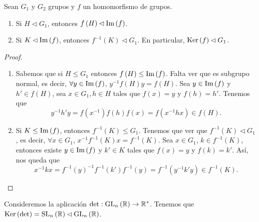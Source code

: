 \begin{prop}
Sean $\displaystyle G_{1} $ y $\displaystyle G_{2} $ grupos y $\displaystyle f $ un homomorfismo de grupos. 
\begin{enumerate}
\item Si $\displaystyle H \lhd G_{1} $, entonces $\displaystyle f\left(H\right) \lhd \operatorname{Im}\left(f\right) $.
\item Si $\displaystyle K \lhd \operatorname{Im}\left(f\right) $, entonces $\displaystyle f^{-1}\left(K\right)\lhd G_{1} $. En particular, $\displaystyle \operatorname{Ker}\left(f\right) \lhd G_{1} $.
\end{enumerate}
\end{prop}
\begin{proof}
\begin{enumerate}
\item Sabemos que si $\displaystyle H \leq G_{1} $ entonces $\displaystyle f\left(H\right) \leq \operatorname{Im}\left(f\right) $. Falta ver que es subgrupo normal, es decir, $\displaystyle \forall y \in \operatorname{Im}\left(f\right) $, $\displaystyle y^{-1}f\left(H\right)y = f\left(H\right) $. Sea $\displaystyle y \in \operatorname{Im}\left(f\right) $ y $\displaystyle h' \in f\left(H\right) $, sea $\displaystyle x \in G_{1}, h \in H $ tales que $\displaystyle f\left(x\right) = y $ y $\displaystyle f\left(h\right) = h' $. Tenemos que 
	\[y^{-1}h'y = f\left(x^{-1}\right)f\left(h\right)f\left(x\right) = f\left(x^{-1}hx\right) \in f\left(H\right) .\]
\item Si $\displaystyle K \leq \operatorname{Im}\left(f\right) $, entonces $\displaystyle f^{-1}\left(K\right) \leq G_{1} $. Tenemos que ver que $\displaystyle f^{-1}\left(K\right) \lhd G_{1} $, es decir, $\displaystyle \forall x \in G_{1} $, $\displaystyle x^{-1}f^{-1}\left(K\right)x = f^{-1}\left(K\right) $. Sea $\displaystyle x \in G_{1} $, $\displaystyle k \in f^{-1}\left(K\right) $, entonces existe $\displaystyle y \in \operatorname{Im}\left(f\right) $ y $\displaystyle k' \in K $ tales que $\displaystyle f\left(x\right) = y $ y $\displaystyle f\left(k\right) = k' $.
Así, nos queda que
\[x^{-1}kx = f^{-1}\left(y\right)^{-1}f^{-1}\left(k'\right)f^{-1}\left(y\right)  = f^{-1}\left(y^{-1}k'y\right) \in f^{-1}\left(K\right) .\]
\end{enumerate}
\end{proof}
\begin{eg}
Consideremos la aplicación $\displaystyle \det : \operatorname{GL}_{n}\left(\mathbb{R}\right) \to \mathbb{R}^{*} $. Tenemos que $\displaystyle \operatorname{Ker}\left(\det\right) = \operatorname{SL}_{n}\left(\mathbb{R}\right) \lhd \operatorname{GL}_{n}\left(\mathbb{R}\right) $. 
\end{eg}

